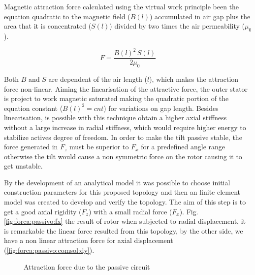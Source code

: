 \documentclass[10pt,fleqn,a4paper,twoside]{article}
\begin{document}
	Magnetic attraction force calculated using the virtual work \citep{Chiba} principle been the equation quadratic to the magnetic field ($B(l)$) accumulated in air gap plus the area that it is concentrated ($S(l)$) divided by two times the air permeability ($\mu_0$).
	
	\begin{equation}
			F = \frac{B(l)^2 \, S(l)}{2 \mu_0}
	\end{equation}
	
	
	Both $B$ and $S$ are dependent of the air length ($l$), which makes the  attraction force non-linear.	Aiming the linearisation of the attractive force, the outer stator is project to work magnetic saturated making the quadratic portion of the equation constant ($B(l)^2 = cnt$) for variations on gap length. Besides linearisation, is possible with this technique obtain a higher axial stiffness without a large increase in radial stiffness, which would require higher energy to stabilize actives degree of freedom. In order to make the tilt passive stable, the force generated in $F_z$ must be superior to $F_x $ for a predefined angle range otherwise the tilt would cause a non symmetric force on the rotor causing it to get unstable.
	
	By the development of an analytical model it was possible to choose initial construction parameters for this proposed topology and then an finite element model was created to develop and verify the topology. The aim of this step is to get a good axial rigidity ($F_z$) with a small  radial force ($F_x$). Fig. \ref{fig:forca:passivo:fx} the result of rotor when subjected to radial displacement, it is remarkable the linear force resulted from this topology, by the other side, we have a non linear attraction force for axial displacement (\ref{fig:forca:passivo:comsol:dy}).
	

	
	\begin{figure}[ht]
		\hfill
		\caption{Attraction force due to the passive circuit}
		\label{fig:forca:passivo}
	\end{figure}	
	
\end{document}
